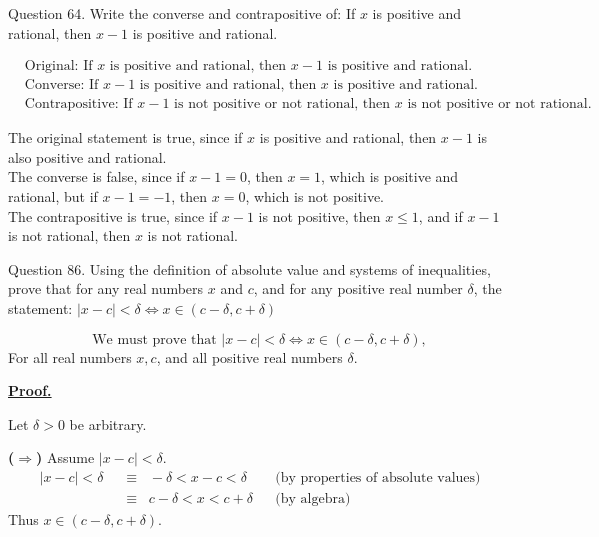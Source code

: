 \documentclass[]{article}
\begin{document}
\begin{question}{Question 64.}
Write the converse and contrapositive of: If $x$ is positive and rational, then $x - 1$ is positive and rational.
\end{question}
\begin{align*}
    & \text{Original: If } x \text{ is positive and rational, then } x - 1 \text{ is positive and rational.} \\
    & \text{Converse: If } x - 1 \text{ is positive and rational, then } x \text{ is positive and rational.} \\
    & \text{Contrapositive: If } x - 1 \text{ is not positive or not rational, then } x \text{ is not positive or not rational.}
\end{align*}
\begin{center}
    The original statement is true, since if $x$ is positive and rational, then $x - 1$ is also positive and rational. \\
    The converse is false, since if $x - 1 = 0$, then $x = 1$, which is positive and rational, but if $x - 1 = -1$, then $x = 0$, which is not positive. \\
    The contrapositive is true, since if $x - 1$ is not positive, then $x \le 1$, and if $x - 1$ is not rational, then $x$ is not rational.
\end{center}

\begin{question}{Question 86.}
Using the definition of absolute value and systems of inequalities, prove that for any real numbers $x$ and $c$, and for any positive real number $\delta$, the statement: $|x-c| < \delta \iff x \in (c-\delta, c+\delta)$
\end{question}

\[
\text{We must prove that } |x-c| < \delta \iff x \in (c-\delta, c+\delta),
\]
For all real numbers $x, c$, and all positive real numbers $\delta$.

\underline{\textbf{Proof.}}  

Let $\delta > 0$ be arbitrary.  

\medskip

\noindent \textbf{($\Rightarrow$)}  
Assume $|x-c| < \delta$.  
\begin{align*}
    |x-c| < \delta 
    &\;\;\equiv\;\; -\delta < x-c < \delta 
    && \text{(by properties of absolute values)} \\[6pt]
    &\;\;\equiv\;\; c-\delta < x < c+\delta 
    && \text{(by algebra)} 
\end{align*}
Thus $x \in (c-\delta, c+\delta)$.  
\end{document}
